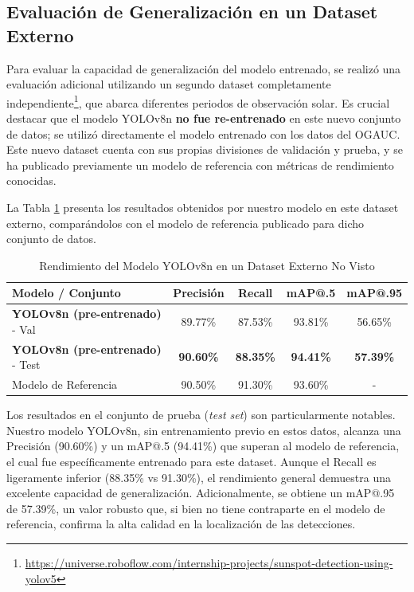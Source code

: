 \documentclass[journal]{IEEEtran}
\begin{document}
\subsection{Evaluación de Generalización en un Dataset Externo}

Para evaluar la capacidad de generalización del modelo entrenado, se realizó una evaluación adicional utilizando un segundo dataset completamente independiente\footnote{\url{https://universe.roboflow.com/internship-projects/sunspot-detection-using-yolov5}}, que abarca diferentes periodos de observación solar. Es crucial destacar que el modelo YOLOv8n \textbf{no fue re-entrenado} en este nuevo conjunto de datos; se utilizó directamente el modelo entrenado con los datos del OGAUC. Este nuevo dataset cuenta con sus propias divisiones de validación y prueba, y se ha publicado previamente un modelo de referencia con métricas de rendimiento conocidas.

La Tabla \ref{tab:generalization_results} presenta los resultados obtenidos por nuestro modelo en este dataset externo, comparándolos con el modelo de referencia publicado para dicho conjunto de datos.

\begin{table}[htbp]
\centering
\caption{Rendimiento del Modelo YOLOv8n en un Dataset Externo No Visto}
\label{tab:generalization_results}
\begin{tabular}{@{}lcccc@{}}
\toprule
\textbf{Modelo / Conjunto} & \textbf{Precisión} & \textbf{Recall} & \textbf{mAP@.5} & \textbf{mAP@.95} \\
\midrule
\textbf{YOLOv8n (pre-entrenado)} - Val & 89.77\% & 87.53\% & 93.81\% & 56.65\% \\
\textbf{YOLOv8n (pre-entrenado)} - Test & \textbf{90.60\%} & \textbf{88.35\%} & \textbf{94.41\%} & \textbf{57.39\%} \\
\midrule
Modelo de Referencia & 90.50\% & 91.30\% & 93.60\% & - \\
\bottomrule
\end{tabular}
\end{table}

Los resultados en el conjunto de prueba (\textit{test set}) son particularmente notables. Nuestro modelo YOLOv8n, sin entrenamiento previo en estos datos, alcanza una Precisión (90.60\%) y un mAP@.5 (94.41\%) que superan al modelo de referencia, el cual fue específicamente entrenado para este dataset. Aunque el Recall es ligeramente inferior (88.35\% vs 91.30\%), el rendimiento general demuestra una excelente capacidad de generalización. Adicionalmente, se obtiene un mAP@.95 de 57.39\%, un valor robusto que, si bien no tiene contraparte en el modelo de referencia, confirma la alta calidad en la localización de las detecciones.
\end{document}
